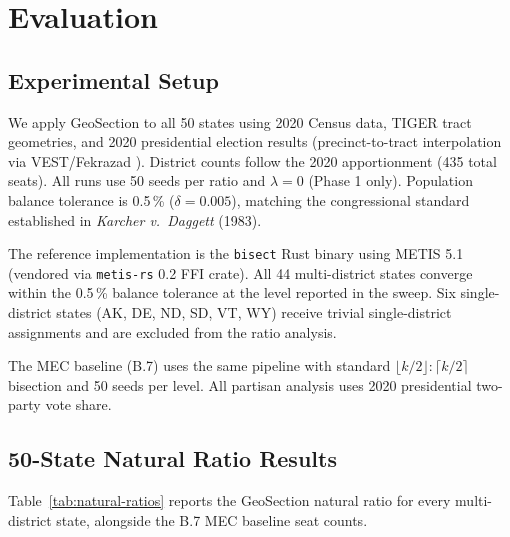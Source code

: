 \section{Evaluation}
\label{sec:evaluation}

\subsection{Experimental Setup}

We apply GeoSection to all 50 states using 2020 Census data, TIGER tract
geometries, and 2020 presidential election results
(precinct-to-tract interpolation via VEST/Fekrazad \citep{fekrazad2021}).
District counts follow the 2020 apportionment (435 total seats).
All runs use 50 seeds per ratio and $\lambda = 0$ (Phase 1 only).
Population balance tolerance is 0.5\,\% ($\delta = 0.005$), matching the
congressional standard established in \emph{Karcher v.\ Daggett} (1983).

The reference implementation is the \texttt{bisect} Rust binary using
METIS 5.1 (vendored via \texttt{metis-rs} 0.2 FFI crate).
All 44 multi-district states converge within the 0.5\,\% balance tolerance
at the level reported in the sweep.
Six single-district states (AK, DE, ND, SD, VT, WY) receive trivial
single-district assignments and are excluded from the ratio analysis.

The MEC baseline (B.7) uses the same pipeline with standard
$\lfloor k/2 \rfloor:\lceil k/2 \rceil$ bisection and 50 seeds per level.
All partisan analysis uses 2020 presidential two-party vote share.

\subsection{50-State Natural Ratio Results}
\label{sec:sweep}

Table~\ref{tab:natural-ratios} reports the GeoSection natural ratio for
every multi-district state, alongside the B.7 MEC baseline seat counts.


